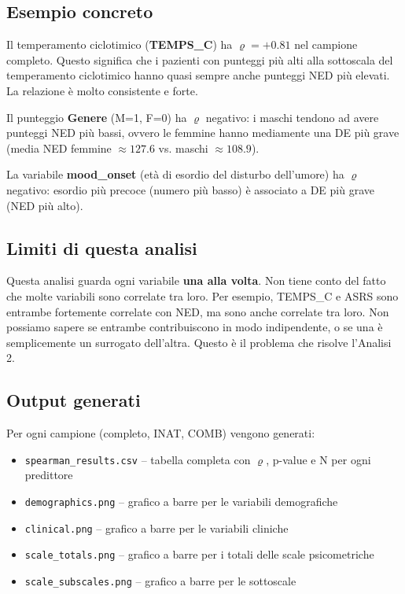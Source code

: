\documentclass[12pt, a4paper]{article}
\begin{document}
\subsection{Esempio concreto}

Il temperamento ciclotimico (\textbf{TEMPS\_C}) ha $\varrho = +0.81$ nel campione completo.
Questo significa che i pazienti con punteggi più alti alla sottoscala del temperamento
ciclotimico hanno quasi sempre anche punteggi NED più elevati. La relazione è molto
consistente e forte.

Il punteggio \textbf{Genere} (M=1, F=0) ha $\varrho$ negativo: i maschi tendono ad avere
punteggi NED più bassi, ovvero le femmine hanno mediamente una DE più grave
(media NED femmine $\approx 127.6$ vs. maschi $\approx 108.9$).

La variabile \textbf{mood\_onset} (età di esordio del disturbo dell'umore) ha $\varrho$
negativo: esordio più precoce (numero più basso) è associato a DE più grave (NED più alto).

\subsection{Limiti di questa analisi}

Questa analisi guarda ogni variabile \textbf{una alla volta}. Non tiene conto del fatto che
molte variabili sono correlate tra loro. Per esempio, TEMPS\_C e ASRS sono entrambe
fortemente correlate con NED, ma sono anche correlate tra loro. Non possiamo sapere se
entrambe contribuiscono in modo indipendente, o se una è semplicemente un surrogato dell'altra.
Questo è il problema che risolve l'Analisi 2.

\subsection{Output generati}

Per ogni campione (completo, INAT, COMB) vengono generati:
\begin{itemize}
    \item \texttt{spearman\_results.csv} -- tabella completa con $\varrho$, p-value e N per
          ogni predittore
    \item \texttt{demographics.png} -- grafico a barre per le variabili demografiche
    \item \texttt{clinical.png} -- grafico a barre per le variabili cliniche
    \item \texttt{scale\_totals.png} -- grafico a barre per i totali delle scale psicometriche
    \item \texttt{scale\_subscales.png} -- grafico a barre per le sottoscale
\end{itemize}
\end{document}
